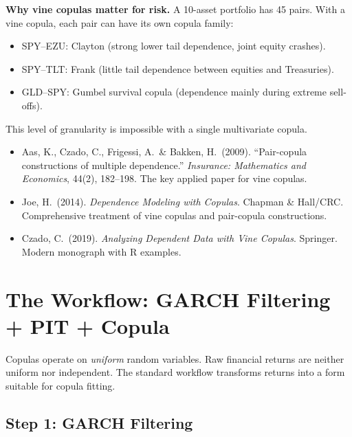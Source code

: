\documentclass[11pt, a4paper]{article}
\theoremstyle{definition}
\theoremstyle{plain}
\theoremstyle{remark}
\begin{document}
\begin{keyidea}
\textbf{Why vine copulas matter for risk.}
A 10-asset portfolio has 45 pairs.
With a vine copula, each pair can have its own copula family:
\begin{itemize}
    \item SPY--EZU: Clayton (strong lower tail dependence, joint equity crashes).
    \item SPY--TLT: Frank (little tail dependence between equities and Treasuries).
    \item GLD--SPY: Gumbel survival copula (dependence mainly during extreme sell-offs).
\end{itemize}
This level of granularity is impossible with a single multivariate copula.
\end{keyidea}

\begin{refbox}
\begin{itemize}
    \item Aas, K., Czado, C., Frigessi, A.\ \& Bakken, H.\ (2009).
          ``Pair-copula constructions of multiple dependence.''
          \emph{Insurance: Mathematics and Economics}, 44(2), 182--198.
          The key applied paper for vine copulas.
    \item Joe, H.\ (2014). \emph{Dependence Modeling with Copulas}.
          Chapman \& Hall/CRC.
          Comprehensive treatment of vine copulas and pair-copula constructions.
    \item Czado, C.\ (2019). \emph{Analyzing Dependent Data with Vine Copulas}.
          Springer. Modern monograph with R examples.
\end{itemize}
\end{refbox}

\section{The Workflow: GARCH Filtering + PIT + Copula}
\label{sec:workflow}

Copulas operate on \emph{uniform} random variables.
Raw financial returns are neither uniform nor independent.
The standard workflow transforms returns into a form suitable for copula fitting.

\subsection{Step 1: GARCH Filtering}
\end{document}

